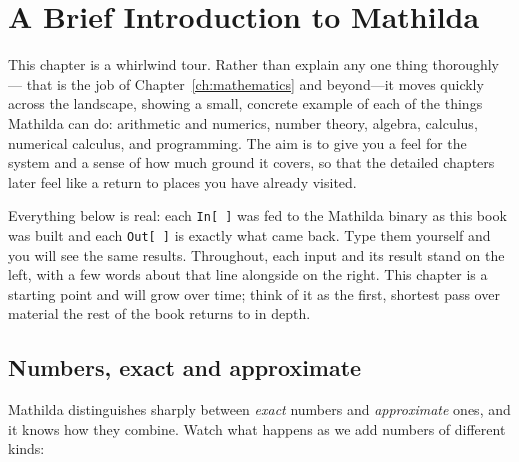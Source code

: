 \chapter{A Brief Introduction to Mathilda}
\label{ch:intro}

This chapter is a whirlwind tour. Rather than explain any one thing thoroughly---%
that is the job of Chapter~\ref{ch:mathematics} and beyond---it moves quickly across
the landscape, showing a small, concrete example of each of the things Mathilda can
do: arithmetic and numerics, number theory, algebra, calculus, numerical calculus,
and programming. The aim is to give you a feel for the system and a sense of how much
ground it covers, so that the detailed chapters later feel like a return to places
you have already visited.

Everything below is real: each \texttt{In[\,]} was fed to the Mathilda binary as this
book was built and each \texttt{Out[\,]} is exactly what came back. Type them yourself
and you will see the same results. Throughout, each input and its result stand on the
left, with a few words about that line alongside on the right. This chapter is a
starting point and will grow over time; think of it as the first, shortest pass over
material the rest of the book returns to in depth.

\section{Numbers, exact and approximate}
\label{sec:intro-numbers}

Mathilda distinguishes sharply between \emph{exact} numbers and \emph{approximate}
ones, and it knows how they combine. Watch what happens as we add numbers of different
kinds:

\begin{codepairs}
\end{codepairs}


